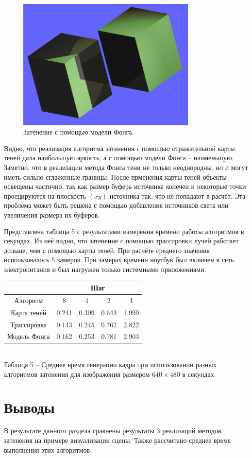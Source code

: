 \begin{figure}[H]
	\centering
	\includegraphics[width=0.8\textwidth]{img/fong.png}
	\caption{Затенение с помощью модели Фонга.}
	\label{img:fong}
\end{figure}

Видно, что реализация алгоритма затенения с помощью отражательной карты теней
дала наибольшую яркость, а с помощью модели Фонга -- наименьшую.
Заметно, что в реализации метода Фонга тени не только
неоднородны, но и могут иметь сильно сглаженные границы.
После прменения карты теней объекты освещены частично,
так как размер буфера источника конечен и некоторые точки проецируются
на плоскость $(xy)$ источника так, что не попадают в расчёт.
Эта проблема может быть решена с помощью добавления источников
света или увеличения размера их буферов.

Представлена таблица 5 с результатами
измерения времени работы алгоритмов в секундах.
Из неё видно, что затенение с помощью трассировки лучей работает
дольше, чем с помощью карты теней.
При расчёте среднего значения использовалось 5 замеров.
При замерах времени ноутбук был включен в сеть электропитания и был нагружен только системными приложениями.

\begin{center}
    \begin{tabular} { |c|c|c|c|c| }
        \hline
        \hspace{0pt} & \multicolumn{4}{|c|}{Шаг} \\
        \hline
        Алгоритм & 8 & 4 & 2 & 1 \\
        \hline
        Карта теней & 0.241 & 0.309 & 0.643 & 1.999 \\
        \hline
        Трассировка & 0.143 & 0.245 & 0.762 & 2.822 \\
        \hline
        Модель Фонга & 0.162 & 0.253 & 0.781 & 2.903 \\
        \hline
    \end{tabular} \\
    \vspace{2mm}
    \small {
        Таблица 5 -- Среднее время генерации кадра при
        использовании разных алгоритмов затенения
        для изображения размером $640 \times 480$ в секундах.
    }
\end{center}


\section*{Выводы}
В результате данного раздела сравнены результаты
3 реализаций методов затенения на примере визуализации сцены.
Также рассчитано среднее время выполнения этих алгоритмов.
